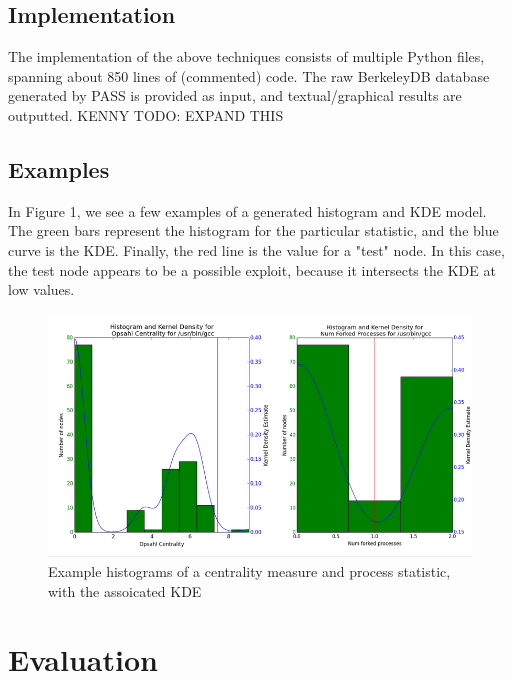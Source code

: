\documentclass[10pt,twocolumn]{article}
\begin{document}
\subsection{Implementation}
The implementation of the above techniques consists of multiple Python files, spanning about 850 lines of (commented) code. The raw BerkeleyDB database generated by PASS is provided as input, and textual/graphical results are outputted.
KENNY TODO: EXPAND THIS
\subsection{Examples}
In Figure 1, we see a few examples of a generated histogram and KDE model. The green bars represent the histogram for the particular statistic, and the blue curve is the KDE. Finally, the red line is the value for a "test" node. In this case, the test node appears to be a possible exploit, because it intersects the KDE at low values. 
\begin{figure}
  \caption{Example histograms of a centrality measure and process statistic, with the assoicated KDE}
  \centering
    \includegraphics[width=\textwidth]{img/hist.png}
\end{figure}


%

\section{Evaluation}
\end{document}
